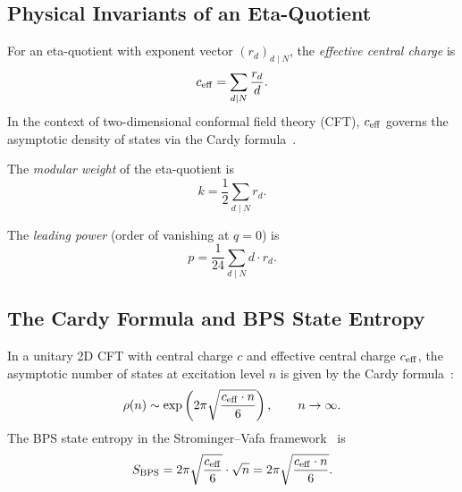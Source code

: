 \subsection{Physical Invariants of an Eta-Quotient}

\begin{definition}
\label{def:c_eff}
For an eta-quotient with exponent vector $(r_d)_{d \mid N}$, the
\emph{effective central charge} is
\begin{equation}
  \label{eq:c_eff}
  c_{\mathrm{eff}} = \sum_{d \mid N} \frac{r_d}{d}.
\end{equation}
In the context of two-dimensional conformal field theory (CFT),
$c_{\mathrm{eff}}$ governs the asymptotic density of states via the Cardy
formula~\cite{cardy_1986}.
\end{definition}

\begin{definition}
\label{def:weight}
The \emph{modular weight} of the eta-quotient is
\begin{equation}
  k = \frac{1}{2} \sum_{d \mid N} r_d.
\end{equation}
\end{definition}

\begin{definition}
\label{def:leading_power}
The \emph{leading power} (order of vanishing at $q = 0$) is
\begin{equation}
  \label{eq:leading_power}
  p = \frac{1}{24} \sum_{d \mid N} d \cdot r_d.
\end{equation}
\end{definition}

\subsection{The Cardy Formula and BPS State Entropy}

In a unitary 2D CFT with central charge $c$ and effective
central charge $c_{\mathrm{eff}}$, the asymptotic number of states at
excitation level $n$ is given by the Cardy
formula~\cite{cardy_1986}:
\begin{equation}
  \label{eq:cardy}
  \rho(n) \sim \exp\left(2\pi \sqrt{\frac{c_{\mathrm{eff}} \cdot n}{6}}\right),
  \qquad n \to \infty.
\end{equation}
The BPS state entropy in the Strominger--Vafa
framework~\cite{strominger_vafa_1996} is
\begin{equation}
  \label{eq:bps_entropy}
  S_{\mathrm{BPS}} = 2\pi \sqrt{\frac{c_{\mathrm{eff}}}{6}} \cdot \sqrt{n}
  = 2\pi \sqrt{\frac{c_{\mathrm{eff}} \cdot n}{6}}.
\end{equation}

